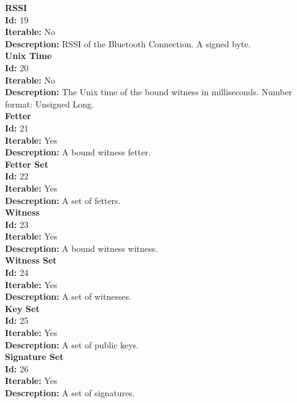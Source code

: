 \documentclass[11pt]{article}
\begin{document}
\noindent
\textbf{RSSI} \\
\indent \textbf{Id:} 19 \\
\indent \textbf{Iterable:} No \\
\indent \textbf{Descreption:} RSSI of the Bluetooth Connection. A signed byte. \\

\noindent
\textbf{Unix Time} \\
\indent \textbf{Id:} 20 \\
\indent \textbf{Iterable:} No \\
\indent \textbf{Descreption:} The Unix time of the bound witness in milliseconds. Number format: Unsigned Long. \\

\noindent
\textbf{Fetter} \\
\indent \textbf{Id:} 21 \\
\indent \textbf{Iterable:} Yes \\
\indent \textbf{Descreption:} A bound witness fetter. \\

\noindent
\textbf{Fetter Set} \\
\indent \textbf{Id:} 22 \\
\indent \textbf{Iterable:} Yes \\
\indent \textbf{Descreption:} A set of fetters. \\

\noindent
\textbf{Witness} \\
\indent \textbf{Id:} 23 \\
\indent \textbf{Iterable:} Yes \\
\indent \textbf{Descreption:} A bound witness witness. \\

\noindent
\textbf{Witness Set} \\
\indent \textbf{Id:} 24 \\
\indent \textbf{Iterable:} Yes \\
\indent \textbf{Descreption:} A set of witnesses. \\

\noindent
\textbf{Key Set} \\
\indent \textbf{Id:} 25 \\
\indent \textbf{Iterable:} Yes \\
\indent \textbf{Descreption:} A set of public keys. \\

\noindent
\textbf{Signature Set} \\
\indent \textbf{Id:} 26 \\
\indent \textbf{Iterable:} Yes \\
\indent \textbf{Descreption:} A set of signatures. \\
\end{document}
